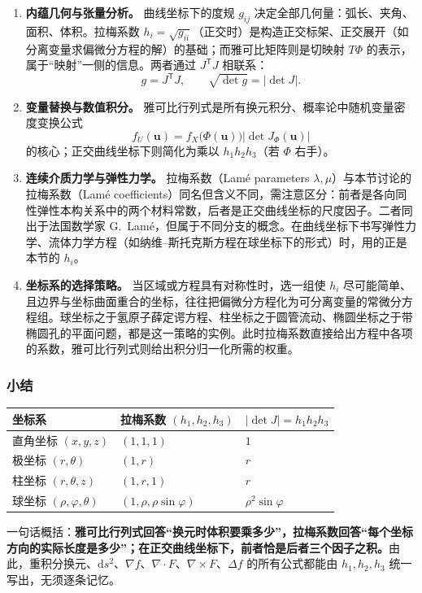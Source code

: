 \begin{enumerate}[label=(\arabic*)]
  \item \textbf{内蕴几何与张量分析。} 曲线坐标下的度规 \(g_{ij}\) 决定全部几何量：弧长、夹角、面积、体积。拉梅系数 \(h_i=\sqrt{g_{ii}}\)（正交时）是构造正交标架、正交展开（如分离变量求偏微分方程的解）的基础；而雅可比矩阵则是切映射 \(T\Phi\) 的表示，属于“映射”一侧的信息。两者通过 \(J^{\mathsf T}J\) 相联系：
  \[
  g=J^{\mathsf T}J,\qquad \sqrt{\det g}=\left|\det J\right| .
  \]
  \item \textbf{变量替换与数值积分。} 雅可比行列式是所有换元积分、概率论中随机变量密度变换公式
  \[
  f_{U}(\mathbf u)=f_X\bigl(\Phi(\mathbf u)\bigr)\left|\det J_\Phi(\mathbf u)\right|
  \]
  的核心；正交曲线坐标下则简化为乘以 \(h_1h_2h_3\)（若 \(\Phi\) 右手）。
  \item \textbf{连续介质力学与弹性力学。} 拉梅系数（Lamé parameters \(\lambda,\mu\)）与本节讨论的拉梅系数（Lamé coefficients）同名但含义不同，需注意区分：前者是各向同性弹性本构关系中的两个材料常数，后者是正交曲线坐标的尺度因子。二者同出于法国数学家 G.\ Lamé，但属于不同分支的概念。在曲线坐标下书写弹性力学、流体力学方程（如纳维--斯托克斯方程在球坐标下的形式）时，用的正是本节的 \(h_i\)。
  \item \textbf{坐标系的选择策略。} 当区域或方程具有对称性时，选一组使 \(h_i\) 尽可能简单、且边界与坐标曲面重合的坐标，往往把偏微分方程化为可分离变量的常微分方程组。球坐标之于氢原子薛定谔方程、柱坐标之于圆管流动、椭圆坐标之于带椭圆孔的平面问题，都是这一策略的实例。此时拉梅系数直接给出方程中各项的系数，雅可比行列式则给出积分归一化所需的权重。
\end{enumerate}

\subsubsection{小结}

\begin{center}
\renewcommand{\arraystretch}{1.35}
\begin{tabular}{lll}
\hline
坐标系 & 拉梅系数 \((h_1,h_2,h_3)\) & \(\left|\det J\right|=h_1h_2h_3\)\\
\hline
直角坐标 \((x,y,z)\) & \((1,1,1)\) & \(1\)\\
极坐标 \((r,\theta)\) & \((1,r)\) & \(r\)\\
柱坐标 \((r,\theta,z)\) & \((1,r,1)\) & \(r\)\\
球坐标 \((\rho,\varphi,\theta)\) & \((1,\rho,\rho\sin\varphi)\) & \(\rho^2\sin\varphi\)\\
\hline
\end{tabular}
\end{center}

\noindent 一句话概括：\textbf{雅可比行列式回答“换元时体积要乘多少”，拉梅系数回答“每个坐标方向的实际长度是多少”；在正交曲线坐标下，前者恰是后者三个因子之积。}由此，重积分换元、\(\mathrm{d}s^2\)、\(\nabla f\)、\(\nabla\cdot F\)、\(\nabla\times F\)、\(\Delta f\) 的所有公式都能由 \(h_1,h_2,h_3\) 统一写出，无须逐条记忆。
